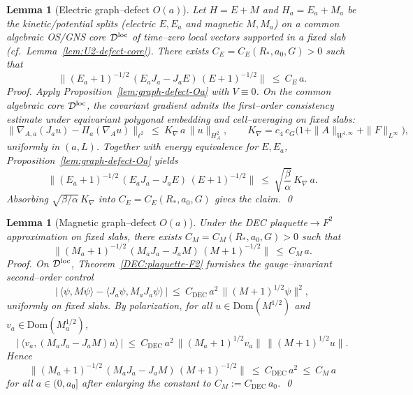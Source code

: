 \documentclass[11pt]{amsart}
\theoremstyle{plain}
\newtheorem{lemma}[theorem]{Lemma}
\theoremstyle{definition}
\theoremstyle{remark}
\renewcommand{\tfrac}[2]{\textstyle\frac{#1}{#2}}
\begin{document}

\medskip
\begin{lemma}[Electric graph--defect $O(a)$]\label{lem:U2-electric}
Let $H=E+M$ and $H_a=E_a+M_a$ be the kinetic/potential splits (electric $E,E_a$ and magnetic $M,M_a$) on a common algebraic OS/GNS core $\mathcal D^{\rm loc}$ of time--zero local vectors supported in a fixed slab (cf.~Lemma~\ref{lem:U2-defect-core}). There exists $C_E=C_E(R_*,a_0,G)>0$ such that
\[
  \big\|(E_a+1)^{-1/2}\,(E_a J_a - J_a E)\,(E+1)^{-1/2}\big\|\ \le\ C_E\, a.
\]
\emph{Proof.} Apply Proposition~\ref{lem:graph-defect-Oa} with $V\equiv 0$. On the common algebraic core $\mathcal D^{\rm loc}$, the covariant gradient admits the first--order consistency estimate under equivariant polygonal embedding and cell--averaging on fixed slabs:
\[
  \big\|\nabla_{A,a}(J_a u)-\Pi_a(\nabla_A u)\big\|_{\ell^2}\ \le\ K_{\nabla}\,a\,\|u\|_{H^{2}_A},\qquad K_{\nabla}=c_4\,c_G\big(1+\|A\|_{W^{1,\infty}}+\|F\|_{L^\infty}\big),
\]
uniformly in $(a,L)$. Together with energy equivalence for $E,E_a$, Proposition~\ref{lem:graph-defect-Oa} yields
\[
  \big\|(E_a+1)^{-1/2}\,(E_a J_a - J_a E)\,(E+1)^{-1/2}\big\|\ \le\ \sqrt{\tfrac{\beta}{\alpha}}\,K_{\nabla}\,a.
\]
Absorbing $\sqrt{\beta/\alpha}\,K_{\nabla}$ into $C_E=C_E(R_*,a_0,G)$ gives the claim. \qed
\end{lemma}

\begin{lemma}[Magnetic graph--defect $O(a)$]\label{lem:U2-magnetic}
Under the DEC plaquette$\to F^2$ approximation on fixed slabs, there exists $C_M=C_M(R_*,a_0,G)>0$ such that
\[
  \big\|(M_a+1)^{-1/2}\,(M_a J_a - J_a M)\,(M+1)^{-1/2}\big\|\ \le\ C_M\, a.
\]
\emph{Proof.} On $\mathcal D^{\rm loc}$, Theorem~\ref{DEC:plaquette-F2} furnishes the gauge--invariant second--order control
\[
  \big|\,\langle \psi, M\psi\rangle - \langle J_a\psi, M_a J_a\psi\rangle\,\big|\ \le\ C_{\mathrm{DEC}}\,a^2\,\| (M+1)^{1/2}\psi\|^2,
\]
uniformly on fixed slabs. By polarization, for all $u\in\mathrm{Dom}(M^{1/2})$ and $v_a\in\mathrm{Dom}(M_a^{1/2})$,
\[
  \big|\,\langle v_a, (M_a J_a - J_a M) u\rangle\,\big|\ \le\ C_{\mathrm{DEC}}\,a^2\,\|(M_a+1)^{1/2}v_a\|\,\|(M+1)^{1/2}u\|.
\]
Hence
\[
  \big\|(M_a+1)^{-1/2}\,(M_a J_a - J_a M)\,(M+1)^{-1/2}\big\|\ \le\ C_{\mathrm{DEC}}\,a^2\ \le\ C_M\,a
\]
for all $a\in(0,a_0]$ after enlarging the constant to $C_M:=C_{\mathrm{DEC}}\,a_0$. \qed
\end{lemma}
\end{document}
